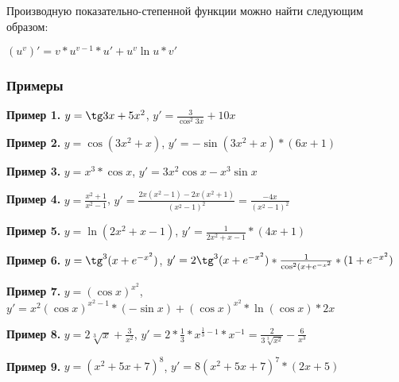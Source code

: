 \documentclass{article}
\begin{document}
\begin{flushleft}
Производную показательно-степенной функции можно найти следующим образом:

$(u^v)' = v * u^{v - 1} * u' + u^v \ln u * v'$

\subsubsection{Примеры}

\textbf{Пример 1.} $y = \tg 3x + 5x^2$, $y' = \frac{3}{\cos^{2} 3x} + 10x$

\hfill

\textbf{Пример 2.} $y = \cos (3x^2 + x)$, $y' = -\sin(3x^2 + x) * (6x + 1)$

\hfill

\textbf{Пример 3.} $y = x^3 * \cos x$, $y' = 3x^2 \cos x - x^3 \sin x$

\hfill

\textbf{Пример 4.} $y = \frac{x^2 + 1}{x^2 - 1}$, $y' = \frac{2x(x^2 - 1) - 2x(x^2 + 1)}{(x^2 - 1)^2} = \frac{-4x}{(x^2 - 1)^2}$

\hfill

\textbf{Пример 5.} $y = \ln (2x^2 + x - 1)$, $y' = \frac{1}{2x^2 + x - 1} * (4x + 1)$

\hfill

\textbf{Пример 6.} $y = \tg^3 (x + e^{-x^2})$, $y' = 2 \tg^3 (x + e^{-x^2}) * \frac{1}{\cos^2(x+e^{-x^2}} * (1 + e^{-x^2})$

\hfill

\textbf{Пример 7. } $y = (\cos x)^{x^2}$, $y' = x^2 (\cos x)^{x^2 - 1} * (-\sin x) + (\cos x)^{x^2} * \ln (\cos x) * 2x$

\hfill

\textbf{Пример 8.} $y = 2 \sqrt[3]{x} + \frac{3}{x^2}$, $y' = 2 * \frac{1}{3} * x^{\frac{1}{3} - 1} * x^{-1} = \frac{2}{3\sqrt[3]{x^2}} - \frac{6}{x^3}$

\hfill

\textbf{Пример 9.} $y = (x^2 + 5x + 7)^{8}$, $y' = 8(x^2 + 5x + 7)^{7} * (2x + 5)$

\end{flushleft}
\end{document}
